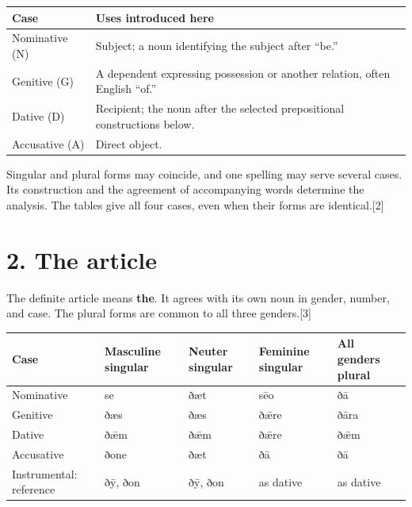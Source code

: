 \par\begingroup
\fontsize{10.5}{13.2}\selectfont
\setlength{\LTleft}{0pt}\setlength{\LTright}{\fill}
\noindent
\begin{tabular}{@{}>{\raggedright\arraybackslash}p{27.369mm}>{\raggedright\arraybackslash}p{93.819mm}@{}}
\toprule
\textbf{Case} & \textbf{Uses introduced here} \\
\midrule
Nominative (N) & Subject; a noun identifying the subject after “be.” \\
Genitive (G) & A dependent expressing possession or another relation, often English “of.” \\
Dative (D) & Recipient; the noun after the selected prepositional constructions below. \\
Accusative (A) & Direct object. \\
\bottomrule
\end{tabular}
\par\endgroup

Singular and plural forms may coincide, and one spelling may serve several cases. Its construction and the agreement of accompanying words determine the analysis. The tables give all four cases, even when their forms are identical.[2]

\section*{2. The article}

The definite article means \textbf{the}. It agrees with its own noun in gender, number, and case. The plural forms are common to all three genders.[3]

\par\begingroup
\fontsize{10.5}{13.2}\selectfont
\setlength{\LTleft}{0pt}\setlength{\LTright}{\fill}
\noindent
\begin{tabular}{@{}>{\raggedright\arraybackslash}p{22.0mm}>{\raggedright\arraybackslash}p{22.688mm}>{\raggedright\arraybackslash}p{22.688mm}>{\raggedright\arraybackslash}p{22.688mm}>{\raggedright\arraybackslash}p{22.688mm}@{}}
\toprule
\textbf{Case} & \textbf{Masculine singular} & \textbf{Neuter singular} & \textbf{Feminine singular} & \textbf{All genders plural} \\
\midrule
Nominative & se & ðæt & sēo & ðā \\
Genitive & ðæs & ðæs & ðǣre & ðāra \\
Dative & ðǣm & ðǣm & ðǣre & ðǣm \\
Accusative & ðone & ðæt & ðā & ðā \\
Instrumental: reference & ðȳ, ðon & ðȳ, ðon & as dative & as dative \\
\bottomrule
\end{tabular}
\par\endgroup

